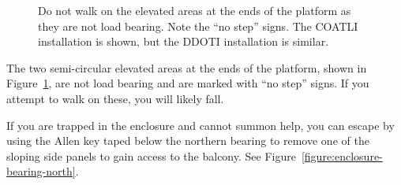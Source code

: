 \begin{figure}
\begin{center}
\end{center}
\caption{Do not walk on the elevated areas at the ends of the platform as they are not load bearing. Note the “no step” signs.
\ifddoti
The COATLI installation is shown, but the DDOTI installation is similar.
\fi
}
\label{figure:enclosure-elevated}
\end{figure}

The two semi-circular elevated areas at the ends of the platform, shown in Figure~\ref{figure:enclosure-elevated}, are not load bearing and are marked with “no step” signs. If you attempt to walk on these, you will likely fall.


If you are trapped in the enclosure and cannot summon help, you can escape by using the Allen key taped below the northern bearing to remove one of the sloping side panels to gain access to the balcony. See Figure~\ref{figure:enclosure-bearing-north}.

